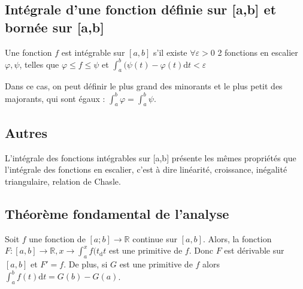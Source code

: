 \documentclass[french]{yLectureNote}
\begin{document}
\subsection{Intégrale d'une fonction définie sur [a,b] et bornée sur [a,b]}
\begin{theorem}[Définition]
Une fonction $f$ est intégrable sur $[a,b]$ s'il existe $\forall \varepsilon >0$ 2 fonctions en escalier $\varphi,\psi$, telles que $\varphi \leq f\leq \psi$ et $\int^b_a (\psi(t)-\varphi(t) \mathrm{d}t < \varepsilon$
\end{theorem}
Dans ce cas, on peut définir le plus grand des minorants et le plus petit des majorants, qui sont égaux : $\int^b_a\varphi = \int^b_a\psi$.
\subsection{Autres}
\begin{theorem}[Proposition]
L'intégrale des fonctions intégrables sur [a,b] présente les m\^emes propriétés que l'intégrale des fonctions en escalier, c'est à dire linéarité, croissance, inégalité triangulaire, relation de Chasle.
\end{theorem}
\subsection{Théorème fondamental de l'analyse}
\begin{theorem}[Théorème]
Soit $f$ une fonction de $[a;b]\to\mathbb{R}$ continue sur $[a,b]$. Alors, la fonction $F : [a,b]\to\mathbb{R}, x\to \int^x_a f(t_\mathrm{d}t$ est une primitive de $f$. Donc $F$ est dérivable sur $[a,b]$ et $F'=f$. De plus, si $G$ est une primitive de $f$ alors $\int^b_af(t)\mathrm{d}t = G(b)-G(a)$.
\end{theorem}
\end{document}
